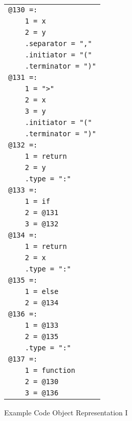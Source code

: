\documentclass[12pt]{article}
\newlength{\figurewidth}
\newenvironment{boxedfigure}[1][!btp]%
	{\begin{figure*}[#1]
	 \begin{lrbox}{\figurebox}
	 \begin{minipage}{\figurewidth}

	 \vspace*{1ex}}%
	{
	 \vspace*{1ex}

	 \end{minipage}
	 \end{lrbox}
	 \begin{center}
	 \fbox{\hspace*{0.1in}\usebox{\figurebox}\hspace*{0.1in}}
	 \end{center}
	 \end{figure*}}
\begin{document}
\begin{boxedfigure}
\small

\begin{center}
\begin{tabular}[t]{@{}l@{}}
\verb/@130 =:/\\
\verb|    1 = x|\\
\verb|    2 = y|\\
\verb|    .separator = ","|\\
\verb|    .initiator = "("|\\
\verb|    .terminator = ")"|\\
\verb/@131 =:/\\
\verb|    1 = ">"|\\
\verb|    2 = x|\\
\verb|    3 = y|\\
\verb|    .initiator = "("|\\
\verb|    .terminator = ")"|\\
\verb/@132 =:/\\
\verb|    1 = return|\\
\verb|    2 = y|\\
\verb|    .type = ":"|\\
\verb/@133 =:/\\
\verb|    1 = if|\\
\verb|    2 = @131|\\
\verb|    3 = @132|\\
\verb/@134 =:/\\
\verb|    1 = return|\\
\verb|    2 = x|\\
\verb|    .type = ":"|\\
\verb/@135 =:/\\
\verb|    1 = else|\\
\verb|    2 = @134|\\
\verb/@136 =:/\\
\verb|    1 = @133|\\
\verb|    2 = @135|\\
\verb|    .type = ":"|\\
\verb/@137 =:/\\
\verb|    1 = function|\\
\verb|    2 = @130|\\
\verb|    3 = @136|\\
\end{tabular}
\end{center}
\vspace*{-3ex}
\caption{Example Code Object Representation I}
\label{EXAMPLE-CODE-OBJECT-REPRESENTATION-1}
\end{boxedfigure}
\end{document}
